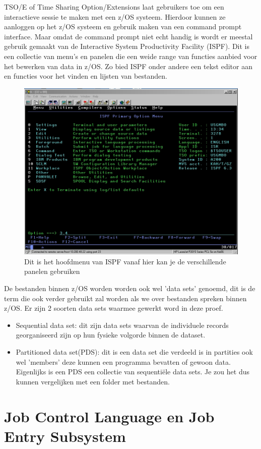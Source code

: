 TSO/E of Time Sharing Option/Extensions laat gebruikers toe om een interactieve sessie te maken met een z/OS systeem. Hierdoor kunnen ze aanloggen op het z/OS systeem en gebruik maken van een command prompt interface. Maar omdat de command prompt niet echt handig is wordt er meestal gebruik gemaakt van de Interactive System Productivity Facility (ISPF). Dit is een collectie van menu's en panelen die een weide range van functies aanbied voor het bewerken van data in z/OS. Zo bied ISPF onder andere een tekst editor aan en functies voor het vinden en lijsten van bestanden. \cite{Parziale2017}

\begin{figure}
	\centering
	\includegraphics[width=0.7\linewidth]{img/IPSF}
	\caption[ISPF hoofdmenu]{Dit is het hoofdmenu van ISPF vanaf hier kan je de verschillende panelen gebruiken}
	\label{fig:ispf}
\end{figure}


De bestanden binnen z/OS worden worden ook wel 'data sets' genoemd, dit is de term die ook verder gebruikt zal worden als we over bestanden spreken binnen z/OS. Er zijn 2 soorten data sets waarmee gewerkt word in deze proef.

\begin{itemize}
	\item Sequential data set: dit zijn data sets waarvan de individuele records georganiseerd zijn op hun fysieke volgorde binnen de dataset.
	\item Partitioned data set(PDS): dit is een data set die verdeeld is in partities ook wel 'members' deze kunnen een programma bevatten of gewoon data. Eigenlijks is een PDS een collectie van sequentiële data sets. Je zou het dus kunnen vergelijken met een folder met bestanden.
\end{itemize}

\section{Job Control Language en Job Entry Subsystem}
\label{sec:Job Control Language en Job Entry Subsystem}

